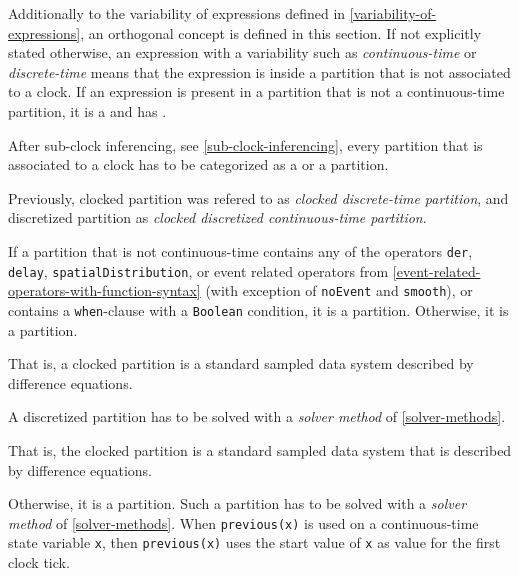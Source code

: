 Additionally to the variability of expressions defined in \cref{variability-of-expressions}, an orthogonal concept  is defined in this section.
If not explicitly stated otherwise, an expression with a variability such as \emph{continuous-time} or \emph{discrete-time} means that the expression is inside a partition that is not associated to a clock.
If an expression is present in a partition that is not a continuous-time partition, it is a  and has .

After sub-clock inferencing, see \cref{sub-clock-inferencing}, every partition that is associated to a clock has to be categorized as a  or a  partition.
\begin{nonnormative}
Previously, clocked partition was refered to as \emph{clocked discrete-time partition}, and discretized partition as \emph{clocked discretized continuous-time partition}.
\end{nonnormative}

If a partition that is not continuous-time contains any of the operators \lstinline!der!, \lstinline!delay!, \lstinline!spatialDistribution!, or event related operators from \cref{event-related-operators-with-function-syntax} (with exception of \lstinline!noEvent! and \lstinline!smooth!), or contains a \lstinline!when!-clause with a \lstinline!Boolean! condition, it is a  partition.
Otherwise, it is a  partition.

\begin{nonnormative}
That is, a clocked partition is a standard sampled data system described by difference equations.
\end{nonnormative}

A discretized partition has to be solved with a \emph{solver method} of \cref{solver-methods}.

\begin{nonnormative}
That is, the clocked partition is a standard sampled data system that is described by difference equations.
\end{nonnormative}

Otherwise, it is a  partition.
Such a partition has to be solved with a \emph{solver method} of \cref{solver-methods}.
When \lstinline!previous(x)! is used on a continuous-time state variable \lstinline!x!, then \lstinline!previous(x)! uses the start value of \lstinline!x! as value for the first clock tick.

